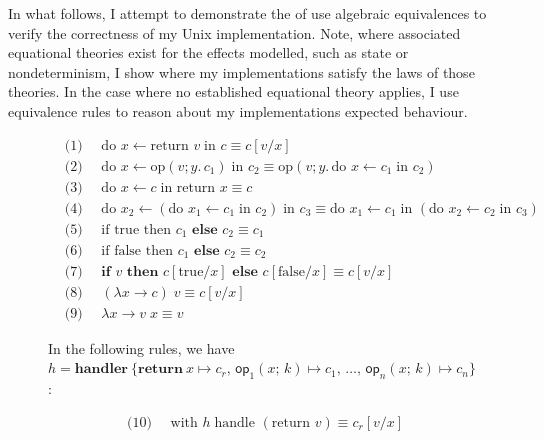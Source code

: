 \documentclass[logo,bsc,singlespacing,parskip]{infthesis}
\begin{document}
In what follows, I attempt to demonstrate the of use algebraic equivalences to verify the correctness of my Unix implementation. Note, where associated equational theories exist for the effects modelled, such as state or nondeterminism, I show where my implementations satisfy the laws of those theories. In the case where no established equational theory applies, I use equivalence rules to reason about my implementations expected behaviour.


\begin{figure}[H]
    \centering
    \begin{tcolorbox}[colframe=black, colback=white, sharp corners]
    \begin{align*}
        &\text{(1) } \quad \text{do } x \leftarrow \text{return } v \; \text{in } c \equiv c[v/x] \\
        &\text{(2) } \quad \text{do } x \leftarrow \text{op}(v; y.\, c_1) \; \text{in } c_2 \equiv \text{op}(v; y.\, \text{do } x \leftarrow c_1 \; \text{in } c_2) \\
        &\text{(3) } \quad \text{do } x \leftarrow c \; \text{in return } x \equiv c \\
        &\text{(4) } \quad \text{do } x_2 \leftarrow (\text{do } x_1 \leftarrow c_1 \; \text{in } c_2) \; \text{in } c_3 \equiv \text{do } x_1 \leftarrow c_1 \; \text{in } (\text{do } x_2 \leftarrow c_2 \; \text{in } c_3) \\
        &\text{(5) } \quad \text{if true then } c_1 \textbf{ else } c_2 \equiv c_1 \\
        &\text{(6) } \quad \text{if false then } c_1 \textbf{ else } c_2 \equiv c_2 \\
        &\text{(7) } \quad \textbf{if } v \textbf{ then } c[\text{true}/x] \textbf{ else } c[\text{false}/x] \equiv c[v/x] \\
        &\text{(8) } \quad (\lambda x \rightarrow c) \; v \equiv c[v/x] \\
        &\text{(9) } \quad \lambda x \rightarrow v \; x \equiv v 
    \end{align*}
    \end{tcolorbox}
In the following rules, we have \( h = \mathbf{handler}\ \{ \mathbf{return}\ x \mapsto c_r,\, \mathsf{op}_1(x;\,k) \mapsto c_1,\, \ldots,\, \mathsf{op}_n(x;\,k) \mapsto c_n \} \):
    \begin{tcolorbox}[colframe=black, colback=white, sharp corners]
    \begin{align*}
        &\text{(10) } \quad \text{with } h \; \text{handle } (\text{return } v) \equiv c_r[v/x] \\

\end{align*}
\end{tcolorbox}
\end{figure}
\end{document}
